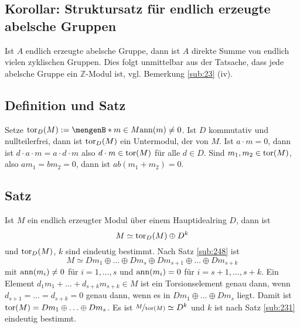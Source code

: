 \subsection{Korollar: Struktursatz für endlich erzeugte abelsche Gruppen} %
\label{sub:249}
Ist $A$ endlich erzeugte abelsche Gruppe, dann ist $A$ direkte Summe von endlich vielen zyklischen Gruppen.
Dies folgt unmittelbar aus der Tatsache, dass jede abelsche Gruppe ein $\mathds{Z}$-Modul ist, vgl. Bemerkung \ref{sub:23} (iv). \bewende

\subsection[Definition und Satz: Torsionsmodul]{Definition und Satz} %
\label{sub:250}
Setze $\tor_D(M) := \set[m \in M]{\ann(m)\not= 0}$. Ist $D$ kommutativ und nullteilerfrei, dann ist $\operatorname{tor}_D(M)$ ein Untermodul, der  von $M$.
Ist $a \cdot m = 0$, dann ist $d \cdot a \cdot m= a \cdot d \cdot m$ also $d \cdot m \in \operatorname{tor}(M)$ für alle $d \in D$. Sind $m_1, m_2 \in \operatorname{tor}(M)$, also
$a m_1 = b m_2 = 0$, dann ist $a b( m_1 + m_2)=0$. \bewende

\subsection[Satz: Zerlegung eines endlich erzeugten Moduls in Torsionsmodul und freien Modul]{Satz} %
\label{sub:251}
Ist $M$ ein endlich erzeugter Modul über einem Hauptidealring $D$, dann ist 
\[
	M \simeq \operatorname{tor}_D(M) \oplus D^k
\]
und $\operatorname{tor}_D(M)$, $k$ sind eindeutig bestimmt.
Nach Satz \ref{sub:248} ist 
\[
	M \simeq D m_1 \oplus \ldots \oplus D m_s \oplus D m_{s+1} \oplus \ldots \oplus D m_{s+k}
\]
mit $\operatorname{ann}(m_i) \not= 0$ für $i=1, \ldots ,s$ und $\operatorname{ann}(m_i)= 0$ für $i=s+1, \ldots , s+k$. Ein Element $d_1 m_1 + \ldots  + d_{s+k} m_{s+k} \in M$ ist ein Torsionselement
genau dann, wenn $d_{s+1} = \ldots = d_{s+k}=0$ genau dann, wenn es in $Dm_1\oplus \ldots \oplus D m_s$ liegt. Damit ist $\operatorname{tor}(M)= D m_1 \oplus \ldots \oplus D m_s$.
Es ist $\nicefrac{M}{\operatorname{tor}(M)} \simeq D^k$ und $k$ ist nach Satz \ref{sub:231} eindeutig bestimmt.

